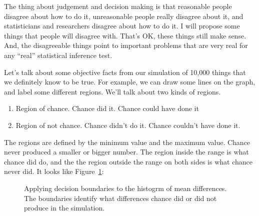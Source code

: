 \documentclass[
  letterpaper,
  DIV=11,
  numbers=noendperiod]{scrreprt}
\providecommand{\tightlist}{%
  \setlength{\itemsep}{0pt}\setlength{\parskip}{0pt}}\usepackage{longtable,booktabs,array}
\begin{document}
The thing about judgement and decision making is that reasonable people
disagree about how to do it, unreasonable people really disagree about
it, and statisticians and researchers disagree about how to do it. I
will propose some things that people will disagree with. That's OK,
these things still make sense. And, the disagreeable things point to
important problems that are very real for any ``real'' statistical
inference test.

Let's talk about some objective facts from our simulation of 10,000
things that we definitely know to be true. For example, we can draw some
lines on the graph, and label some different regions. We'll talk about
two kinds of regions.

\begin{enumerate}
\def\labelenumi{\arabic{enumi}.}
\tightlist
\item
  Region of chance. Chance did it. Chance could have done it
\item
  Region of not chance. Chance didn't do it. Chance couldn't have done
  it.
\end{enumerate}

The regions are defined by the minimum value and the maximum value.
Chance never produced a smaller or bigger number. The region inside the
range is what chance did do, and the the region outside the range on
both sides is what chance never did. It looks like
Figure~\ref{fig-5crumpdecision}:

\begin{figure}


\caption{\label{fig-5crumpdecision}Applying decision boundaries to the
histogrm of mean differences. The boundaries identify what differences
chance did or did not produce in the simulation.}

\end{figure}%
\end{document}
